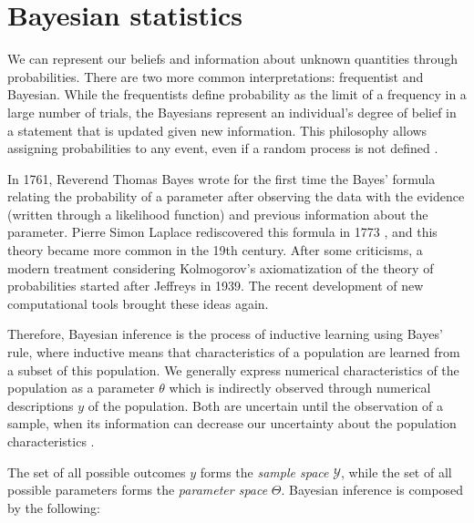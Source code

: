 \section{Bayesian statistics}
\label{sec:bayesian_statistics}

We can represent our beliefs and information about unknown quantities 
through probabilities. There are two more common interpretations: 
frequentist and Bayesian. While the frequentists define
probability as the limit of a frequency in a large number of trials, the
Bayesians represent an individual's degree of belief in a statement that is
updated given new information. This philosophy allows assigning probabilities
to any event, even if a random process is not defined \cite{statisticat2016laplacesdemon}. 

In 1761, Reverend Thomas Bayes wrote for the first time the Bayes' formula
relating the probability of a parameter after observing the data with the
evidence (written through a likelihood function) and previous information
about the parameter. Pierre Simon Laplace rediscovered this formula in 1773
\cite{Robert2007}, and this theory became more common in the 19th century.
After some criticisms, a modern treatment considering Kolmogorov's
axiomatization of the theory of probabilities started after Jeffreys in 1939.
The recent development of new computational tools brought these ideas again.

Therefore, Bayesian inference is the process of inductive learning using
Bayes' rule, where inductive means that characteristics of a population are 
learned from a subset of this population. We generally
express numerical characteristics of the population as a parameter $\theta$ which is
indirectly observed through numerical descriptions $y$ of the population. Both are
uncertain until the observation of a sample, when its information can decrease
our uncertainty about the population characteristics \cite[p. 1-2]{hoff2009first}.

The set of all possible outcomes $y$ forms the {\em sample space}
$\mathcal{Y}$, while the set of all possible parameters forms the {\em
parameter space} $\Theta$. Bayesian inference is composed by the following: 

